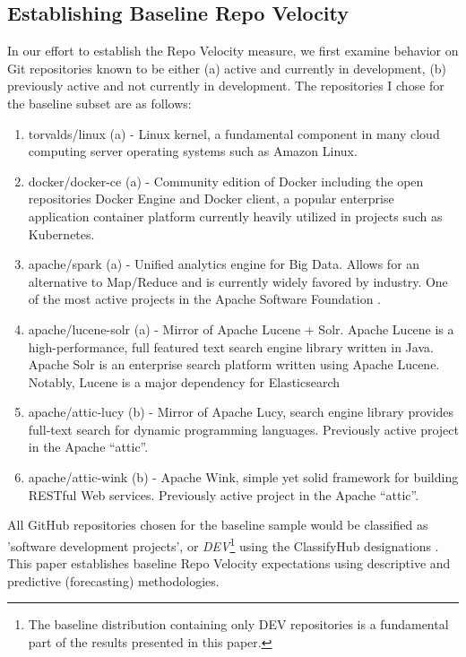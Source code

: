 \documentclass{article}
\begin{document}
\subsection{Establishing Baseline Repo Velocity}

In our effort to establish the Repo Velocity measure, we first examine
behavior on Git repositories known to be either (a) active and currently
in development, (b) previously active and not currently in development. The
repositories I chose for the baseline subset are as follows:

\begin{enumerate}
\item torvalds/linux (a) - Linux kernel, a fundamental component in many
  cloud computing server operating systems such as Amazon Linux.
\item docker/docker-ce (a) - Community edition of Docker including the open
  repositories Docker Engine and Docker client, a popular enterprise
  application container platform currently heavily utilized in projects
  such as Kubernetes.
\item apache/spark (a) - Unified analytics engine for Big Data. Allows for
  an alternative to Map/Reduce and is currently widely favored by industry.
  One of the most active projects in the Apache Software Foundation
  \cite{TheApach51:online}.
\item apache/lucene-solr (a) - Mirror of Apache Lucene + Solr. Apache Lucene
  is a high-performance, full featured text search engine library written in
  Java. Apache Solr is an enterprise search platform written using Apache
  Lucene. Notably, Lucene is a major dependency for Elasticsearch
  \cite{elastics3:online}
\item apache/attic-lucy (b) - Mirror of Apache Lucy, search engine library
  provides full-text search for dynamic programming languages. Previously
  active project in the Apache ``attic''.
\item apache/attic-wink (b) - Apache Wink, simple yet solid framework for
  building RESTful Web services. Previously active project in the Apache
  ``attic''.
\end{enumerate}

All GitHub repositories chosen for the baseline sample would be classified
as 'software development projects', or \textit{DEV}\footnote{The baseline
  distribution containing only DEV repositories is a fundamental part of
  the results presented in this paper.} using the ClassifyHub designations
\cite{soll2017classifyhub}. This paper establishes baseline Repo Velocity
expectations using descriptive and predictive (forecasting) methodologies.
\end{document}
